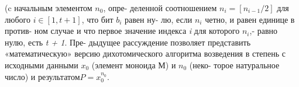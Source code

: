 \noindent (c начальным элементом $n_{0}$, опре-\linebreak
деленной соотношением $n_{i} = [n_{i-1} / 2]$ для \linebreak
любого \textit{$i \in [1,t + 1]$}, что бит $b_{i}$ равен ну-\linebreak
лю, если $n_{i}$ четно, и равен единице в против­-\linebreak
ном случае и что первое значение индекса \textit{i} \linebreak
для которого \textit{$n_{i}$},- равно нулю, есть \textit{t + 1}. Пре­-\linebreak
дыдущее рассуждение позволяет представить\linebreak
«математическую» версию дихотомического\linebreak
алгоритма возведения в степень с исходными\linebreak
данными $x_{0}$ (элемент моноида М) и $n_{0}$ (неко­-\linebreak
торое натуральное число) и результатом\linebreak\textit{$P = x_{0}^{n_{0}}$}.
\newline

